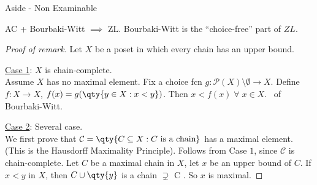 \begin{aside}{Aside - Non Examinable}
    \begin{remark}
        AC + Bourbaki-Witt $\implies$ ZL. Bourbaki-Witt is the ``choice-free'' part of $ZL$.
    \end{remark}

    \begin{proof}[Proof of remark]
        Let $X$ be a poset in which every chain has an upper bound.

        \underline{Case 1}: $X$ is chain-complete. \\
        Assume $X$ has no maximal element.
        Fix a choice fcn $g : \mathcal{P}(X) \setminus \emptyset \to X$.
        Define $f : X \to X$, $f(x) = g(\qty{y \in X : x < y})$.
        Then $x < f(x) \; \forall \; x \in X$. \Lightning \ of Bourbaki-Witt.

        \underline{Case 2}: Several case. \\
        We first prove that $\mathcal{C} = \qty{C \subseteq X : C \text{ is a chain}}$ has a maximal element.
        (This is the Hausdorff Maximality Principle).
        Follows from Case $1$, since $\mathcal{C}$ is chain-complete.
        Let $C$ be a maximal chain in $X$, let $x$ be an upper bound of $C$.
        If $x < y$ in $X$, then $C \cup \qty{y}$ is a chain $\supsetneq$ C \Lightning.
        So $x$ is maximal.
    \end{proof}
\end{aside}